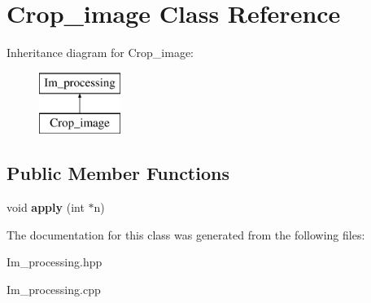 \hypertarget{class_crop__image}{\section{Crop\+\_\+image Class Reference}
\label{class_crop__image}
}
Inheritance diagram for Crop\+\_\+image\+:\begin{figure}[H]
\begin{center}
\leavevmode
\includegraphics[height=2.000000cm]{class_crop__image}
\end{center}
\end{figure}
\subsection*{Public Member Functions}
\begin{DoxyCompactItemize}
\item 
\hypertarget{class_crop__image_afb126cc9f7a3c57ce94a0e483fe2d217}{void {\bfseries apply} (int $\ast$n)}\label{class_crop__image_afb126cc9f7a3c57ce94a0e483fe2d217}

\end{DoxyCompactItemize}


The documentation for this class was generated from the following files\+:\begin{DoxyCompactItemize}
\item 
Im\+\_\+processing.\+hpp\item 
Im\+\_\+processing.\+cpp\end{DoxyCompactItemize}
